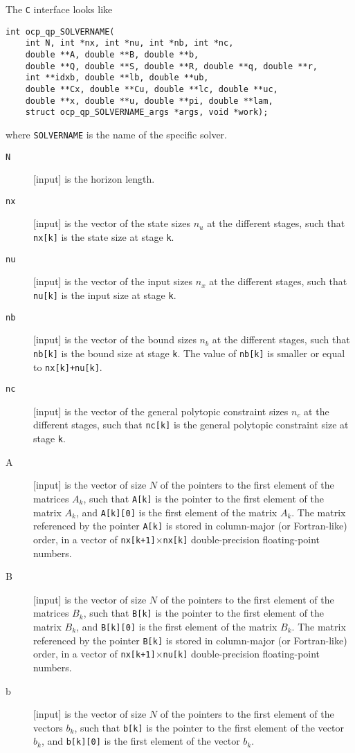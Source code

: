 \documentclass{report}
\begin{document}
The \texttt{C} interface looks like
\begin{verbatim}
int ocp_qp_SOLVERNAME(
    int N, int *nx, int *nu, int *nb, int *nc, 
    double **A, double **B, double **b, 
    double **Q, double **S, double **R, double **q, double **r, 
    int **idxb, double **lb, double **ub, 
    double **Cx, double **Cu, double **lc, double **uc, 
    double **x, double **u, double **pi, double **lam,
    struct ocp_qp_SOLVERNAME_args *args, void *work);
\end{verbatim}
where {\tt SOLVERNAME} is the name of the specific solver.
\begin{description}
\item[{\tt N}] [input] is the horizon length.
\item[{\tt nx}] [input] is the vector of the state sizes $n_u$ at the different stages, such that {\tt nx[k]} is the state size at stage {\tt k}.
\item[{\tt nu}] [input] is the vector of the input sizes $n_x$ at the different stages, such that {\tt nu[k]} is the input size at stage {\tt k}.
\item[{\tt nb}] [input] is the vector of the bound sizes $n_b$ at the different stages, such that {\tt nb[k]} is the bound size at stage {\tt k}.
The value of {\tt nb[k]} is smaller or equal to {\tt nx[k]+nu[k]}.
\item[{\tt nc}] [input] is the vector of the general polytopic constraint sizes $n_c$ at the different stages, such that {\tt nc[k]} is the general polytopic constraint size at stage {\tt k}.
\item[A] [input] is the vector of size $N$ of the pointers to the first element of the matrices $A_k$, such that {\tt A[k]} is the pointer to the first element of the matrix $A_k$, and {\tt A[k][0]} is the first element of the matrix $A_k$.
The matrix referenced by the pointer {\tt A[k]} is stored in column-major (or Fortran-like) order, in a vector of {\tt nx[k+1]$\times$nx[k]} double-precision floating-point numbers.
\item[B] [input] is the vector of size $N$ of the pointers to the first element of the matrices $B_k$, such that {\tt B[k]} is the pointer to the first element of the matrix $B_k$, and {\tt B[k][0]} is the first element of the matrix $B_k$.
The matrix referenced by the pointer {\tt B[k]} is stored in column-major (or Fortran-like) order, in a vector of {\tt nx[k+1]$\times$nu[k]} double-precision floating-point numbers.
\item[b] [input] is the vector of size $N$ of the pointers to the first element of the vectors $b_k$, such that {\tt b[k]} is the pointer to the first element of the vector $b_k$, and {\tt b[k][0]} is the first element of the vector $b_k$.

\end{description}
\end{document}
